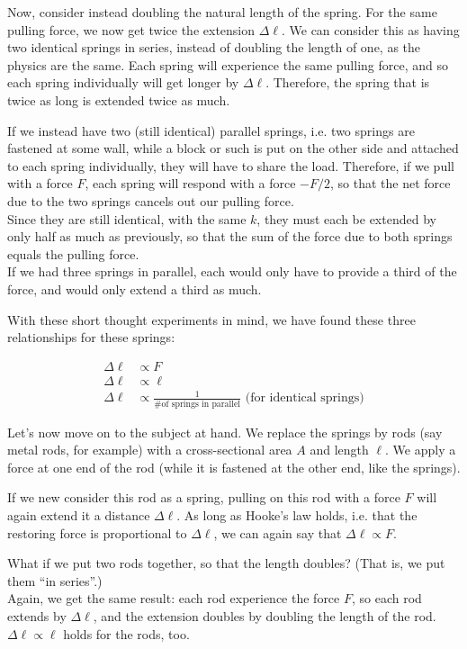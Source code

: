 Now, consider instead doubling the natural length of the spring. For the same pulling force, we now get twice the extension $\Delta \ell$. We can consider this as having two identical springs in series, instead of doubling the length of one, as the physics are the same. Each spring will experience the same pulling force, and so each spring individually will get longer by $\Delta \ell$. Therefore, the spring that is twice as long is extended twice as much.

If we instead have two (still identical) parallel springs, i.e. two springs are fastened at some wall, while a block or such is put on the other side and attached to each spring individually, they will have to share the load. Therefore, if we pull with a force $F$, each spring will respond with a force $-F/2$, so that the net force due to the two springs cancels out our pulling force.\\
Since they are still identical, with the same $k$, they must each be extended by only half as much as previously, so that the sum of the force due to both springs equals the pulling force.\\
If we had three springs in parallel, each would only have to provide a third of the force, and would only extend a third as much.

With these short thought experiments in mind, we have found these three relationships for these springs:

\begin{align}
\Delta \ell &\propto F\\
\Delta \ell &\propto \ell\\
\Delta \ell &\propto \frac{1}{\text{\# of springs in parallel}} \text{ (for identical springs)}
\end{align}

Let's now move on to the subject at hand. We replace the springs by rods (say metal rods, for example) with a cross-sectional area $A$ and length $\ell$. We apply a force at one end of the rod (while it is fastened at the other end, like the springs).

If we new consider this rod as a spring, pulling on this rod with a force $F$ will again extend it a distance $\Delta \ell$. As long as Hooke's law holds, i.e. that the restoring force is proportional to $\Delta \ell$, we can again say that $\Delta \ell \propto F$.

What if we put two rods together, so that the length doubles? (That is, we put them ``in series''.)\\
Again, we get the same result: each rod experience the force $F$, so each rod extends by $\Delta \ell$, and the extension doubles by doubling the length of the rod. $\Delta \ell \propto \ell$ holds for the rods, too.

